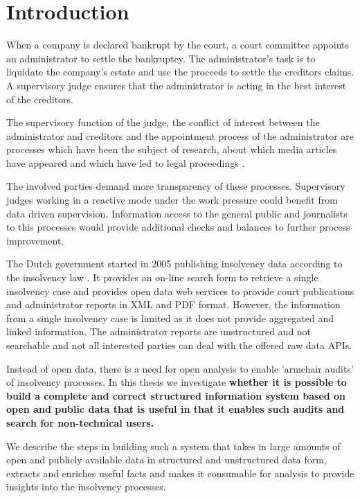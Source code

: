 \section{Introduction}
When a company is declared bankrupt by the court, a court committee appoints an administrator to settle the bankruptcy. The administrator's task is to liquidate the company's estate and use the proceeds to settle the creditors claims. A supervisory judge ensures that the administrator is acting in the best interest of the creditors.

The supervisory function of the judge, the conflict of interest between the administrator and creditors and the appointment process of the administrator are processes which have been the subject of research\cite{boluk_2011}, about which media articles have appeared \cite{dennis_meneer_2018:1, dennis_meneer_2017:1, jan-hein_strop_2015:1} and which have led to legal proceedings . 

The involved parties demand more transparency of these processes. Supervisory judges working in a reactive mode under the work pressure could benefit from data driven supervision. Information access to the general public and journalists to this processes  would provide additional checks and balances to further process improvement.

The Dutch government started in 2005 publishing insolvency data\cite{rechtspraak:1} according to the insolvency law \cite{law:1}. It provides an on-line search form \cite{rechtspraak:4} to retrieve a single insolvency case and provides open data web services to provide court publications and administrator reports in XML and PDF format. However, the information from a single insolvency case is limited as it does not provide aggregated and linked information. The administrator reports are unstructured and not searchable and not all interested parties can deal with the offered raw data APIs. 

Instead of open data, there is a need for open analysis to enable 'armchair audits'\cite{o_leary_2015} of insolvency processes. In this thesis we investigate \textbf{whether it is possible to build a complete and correct structured information system based on open and public data that is useful in that it enables such audits and search for non-technical users.}

We describe the steps in building such a system that takes in large amounts of open and publicly available data in structured and unstructured data form, extracts and enriches useful facts and makes it consumable for analysis to provide insights into the insolvency processes.
